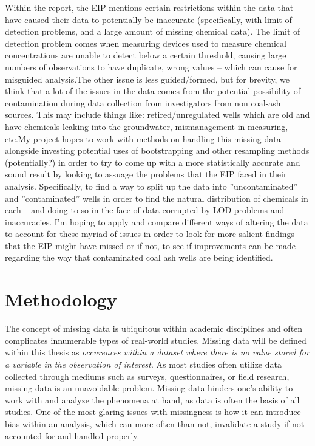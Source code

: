 \documentclass[12pt, twoside]{amherstthesis}
\begin{document}
Within the report, the EIP mentions certain restrictions within the data that have caused their data to potentially be inaccurate (specifically, with limit of detection problems, and a large amount of missing chemical data). The limit of detection problem comes when measuring devices used to measure chemical concentrations are unable to detect below a certain threshold, causing large numbers of observations to have duplicate, wrong values -- which can cause for misguided analysis.The other issue is less guided/formed, but for brevity, we think that a lot of the issues in the data comes from the potential possibility of contamination during data collection from investigators from non coal-ash sources. This may include things like: retired/unregulated wells which are old and have chemicals leaking into the groundwater, mismanagement in measuring, etc.My project hopes to work with methods on handling this missing data -- alongside investing potential uses of bootstrapping and other resampling methods (potentially?) in order to try to come up with a more statistically accurate and sound result by looking to assuage the problems that the EIP faced in their analysis. Specifically, to find a way to split up the data into ''uncontaminated'' and ''contaminated'' wells in order to find the natural distribution of chemicals in each -- and doing to so in the face of data corrupted by LOD problems and inaccuracies. I'm hoping to apply and compare different ways of altering the data to account for these myriad of issues in order to look for more salient findings that the EIP might have missed or if not, to see if improvements can be made regarding the way that contaminated coal ash wells are being identified.

\hypertarget{methodology}{%
\chapter{Methodology}\label{methodology}}

The concept of missing data is ubiquitous within academic disciplines and often complicates innumerable types of real-world studies. Missing data will be defined within this thesis as \emph{occurences within a dataset where there is no value stored for a variable in the observation of interest}. As most studies often utilize data collected through mediums such as surveys, questionnaires, or field research, missing data is an unavoidable problem. Missing data hinders one's ability to work with and analyze the phenomena at hand, as data is often the basis of all studies. One of the most glaring issues with missingness is how it can introduce bias within an analysis, which can more often than not, invalidate a study if not accounted for and handled properly.
\end{document}
